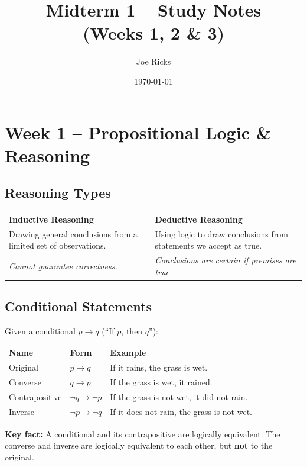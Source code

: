 \documentclass{article}
\title{Midterm 1 -- Study Notes\\(Weeks 1, 2 \& 3)}
\author{Joe Ricks}
\date{\today}
\begin{document}
\maketitle


\section*{Week 1 -- Propositional Logic \& Reasoning}

\subsection*{Reasoning Types}

\begin{tabular}{p{7cm}p{7cm}}
\textbf{Inductive Reasoning} & \textbf{Deductive Reasoning} \\
Drawing general conclusions from a limited set of observations. & Using logic to draw conclusions from statements we accept as true. \\
\textit{Cannot guarantee correctness.} & \textit{Conclusions are certain if premises are true.}
\end{tabular}

\subsection*{Conditional Statements}

Given a conditional $p \to q$ (``If $p$, then $q$''):

\medbreak

\begin{tabular}{lll}
\textbf{Name} & \textbf{Form} & \textbf{Example} \\[4pt]
Original & $p \to q$ & If it rains, the grass is wet. \\
Converse & $q \to p$ & If the grass is wet, it rained. \\
Contrapositive & $\neg q \to \neg p$ & If the grass is not wet, it did not rain. \\
Inverse & $\neg p \to \neg q$ & If it does not rain, the grass is not wet.
\end{tabular}

\medbreak
\textbf{Key fact:} A conditional and its contrapositive are logically equivalent. The converse and inverse are logically equivalent to each other, but \textbf{not} to the original.
\end{document}
